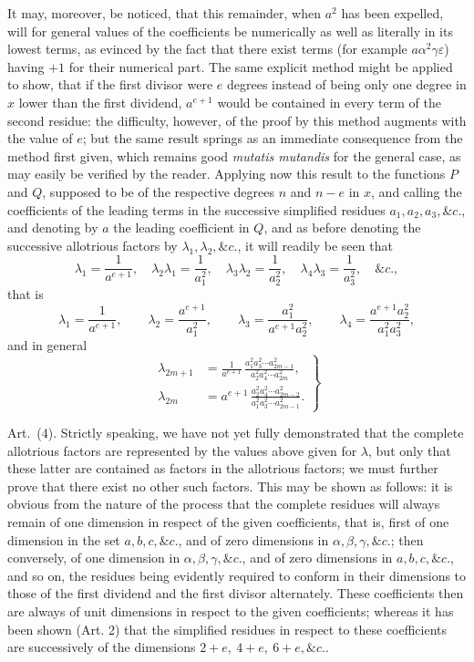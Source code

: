 \documentclass[11pt]{article}
\newcommand{\sourcepage}[1]{\marginpar{\scriptsize p.~#1}}
\newcommand{\art}[1]{\par\smallskip\noindent Art.~(#1).\quad}
\begin{document}
It may, moreover, be noticed, that this remainder, when $a^2$ has been expelled, will for general values of the coefficients be numerically as well as literally in its lowest terms, as evinced by the fact that there exist terms (for example $a\alpha^2\gamma\varepsilon$) having $+1$ for their numerical part. The same explicit method might be applied to show, that if the first divisor were $e$ degrees instead of being only one degree in $x$ lower than the first dividend, $a^{e+1}$ would be contained in every term of the second residue: the difficulty, however, of the proof by this method augments with the value of $e$; but the same result springs as an immediate consequence from the method first given, which remains good \emph{mutatis mutandis} for the general case, as may easily be verified by the reader. Applying now this result to the functions $P$ and $Q$, supposed to be of the respective degrees $n$ and $n-e$ in $x$, and calling the coefficients of the leading terms in the successive simplified residues $a_1,a_2,a_3,\&c.$, and denoting by $a$ the leading coefficient in $Q$, and as before denoting the successive allotrious factors by $\lambda_1,\lambda_2,\&c.$, it will readily be seen that
\[
\lambda_1=\frac1{a^{e+1}},\quad
\lambda_2\lambda_1=\frac1{a_1^2},\quad
\lambda_3\lambda_2=\frac1{a_2^2},\quad
\lambda_4\lambda_3=\frac1{a_3^2},\quad\&c.,
\]
that is
\[
\lambda_1=\frac1{a^{e+1}},\qquad
\lambda_2=\frac{a^{e+1}}{a_1^2},\qquad
\lambda_3=\frac{a_1^2}{a^{e+1}a_2^2},\qquad
\lambda_4=\frac{a^{e+1}a_2^2}{a_1^2a_3^2},
\]
and in general
\[
\left.
\begin{aligned}
\lambda_{2m+1}&=\frac1{a^{e+1}}\,
\frac{a_1^2a_3^2\cdots a_{2m-1}^2}{a_2^2a_4^2\cdots a_{2m}^2},\\
\lambda_{2m}&=a^{e+1}\,
\frac{a_2^2a_4^2\cdots a_{2m-2}^2}{a_1^2a_3^2\cdots a_{2m-1}^2}.
\end{aligned}
\right\}
\tag{8}
\]

\sourcepage{443}
\art{4} Strictly speaking, we have not yet fully demonstrated that the complete allotrious factors are represented by the values above given for $\lambda$, but only that these latter are contained as factors in the allotrious factors; we must further prove that there exist no other such factors. This may be shown as follows: it is obvious from the nature of the process that the complete residues will always remain of one dimension in respect of the given coefficients, that is, first of one dimension in the set $a,b,c,\&c.$, and of zero dimensions in $\alpha,\beta,\gamma,\&c.$; then conversely, of one dimension in $\alpha,\beta,\gamma,\&c.$, and of zero dimensions in $a,b,c,\&c.$, and so on, the residues being evidently required to conform in their dimensions to those of the first dividend and the first divisor alternately. These coefficients then are always of unit dimensions in respect to the given coefficients; whereas it has been shown (Art. 2) that the simplified residues in respect to these coefficients are successively of the dimensions $2+e,\ 4+e,\ 6+e,\&c.$.
\end{document}
